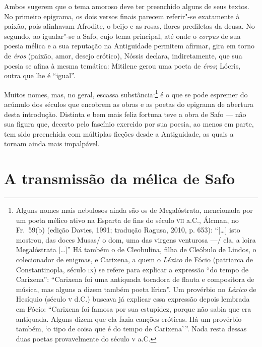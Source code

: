 Ambos sugerem que o tema amoroso deve ter preenchido alguns de seus textos. No
primeiro epigrama, os dois versos finais parecem referir"-se exatamente à
paixão, pois alinhavam Afrodite, o beijo e as rosas, flores prediletas da
deusa. No segundo, ao igualar"-se a Safo, cujo tema principal, até onde o
\textit{corpus} de sua poesia mélica e a sua reputação na Antiguidade permitem
afirmar, gira em torno de \textit{éros} (paixão, amor, desejo erótico), Nóssis
declara, indiretamente, que sua poesia se afina à mesma temática: Mitilene
gerou uma poeta de \textit{éros}; Lócris, outra que lhe é ``igual”.

Muitos nomes, mas, no geral, escassa substância:\footnote{ Alguns nomes mais nebulosos ainda são
os de Megalóstrata, mencionada por um poeta mélico ativo na Esparta de fins do
século \textsc{vii} a.C., Álcman, no Fr.~59(b) (edição Davies, 1991;
tradução Ragusa, 2010, p. 653): ``[\ldots{}] isto mostrou, das doces
Musas/ o dom, uma das virgens venturosa ---/ ela, a loira Megalóstrata [\ldots{}]'' Há
também o de Cleobulina, filha de Cleóbulo de Lindos, o colecionador de enigmas,
e Carixena, a quem o \textit{Léxico} de Fócio (patriarca de Constantinopla,
século \textsc{ix}) se refere para explicar a expressão ``do tempo de Carixena”:
``Carixena foi uma antiquada tocadora de flauta e compositora de música,
mas alguns a dizem também poeta lírica”. Um provérbio no \textit{Léxico} de
Hesíquio (século \textsc{v} d.C.) buscava já explicar essa expressão depois lembrada em
Fócio: ``Carixena foi famosa por sua estupidez, porque não sabia que era
antiquada. Alguns dizem que ela fazia canções eróticas. Há um provérbio também,
‘o tipo de coisa que é do tempo de Carixena’\,”. Nada resta dessas duas poetas
provavelmente do século \textsc{v} a.C.} é o que se pode espremer do acúmulo dos
séculos que encobrem as obras e as poetas do epigrama de abertura desta
introdução. Distinta e bem mais feliz fortuna teve a obra de Safo --- não sua
figura que, decerto pelo fascínio exercido por sua poesia, ao menos em parte,
tem sido preenchida com múltiplas ficções desde a Antiguidade, as quais a
tornam ainda mais impalpável. 

\section*{A transmissão da mélica de Safo}

